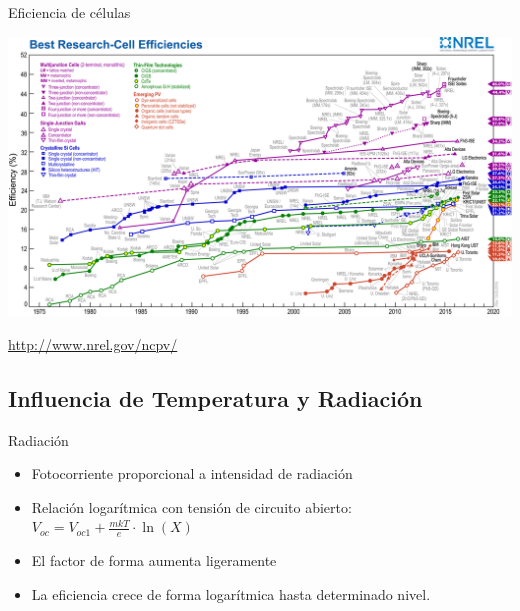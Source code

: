 \documentclass[xcolor={usenames,svgnames,dvipsnames}]{beamer}
\begin{document}
\begin{frame}[plain,label={sec:org7139f5f}]{Eficiencia de células}
\begin{center}
\includegraphics[width=1.2\textwidth]{../figs/efficiency_chart_nrel.jpg}
\end{center}

\url{http://www.nrel.gov/ncpv/}
\end{frame}

\subsection{Influencia de Temperatura y Radiación}
\label{sec:org79d6796}

\begin{frame}[label={sec:org9f0ecc8}]{Radiación}
\begin{itemize}
\item \alert{Fotocorriente proporcional a intensidad de radiación}

\item Relación logarítmica con tensión de circuito abierto:
\(V_{oc}=V_{oc1}+\frac{mkT}{e}\cdot\ln(X)\)

\item El factor de forma aumenta ligeramente

\item La eficiencia crece de forma logarítmica hasta determinado nivel.
\end{itemize}
\end{frame}
\end{document}
